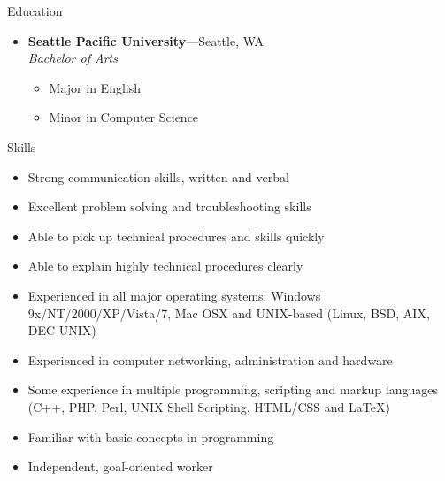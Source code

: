 \documentclass[10pt,oneside]{article}
\newenvironment{ressection}[1]{
	\vspace{4pt}
	{\fontfamily{ppl}\selectfont\Large#1}
	\begin{itemize}
	\vspace{3pt}
}{
	\end{itemize}
}
\newcommand{\resitem}[1]{
	\vspace{-4pt}
	\item \begin{flushleft} #1 \end{flushleft}
}
\newcommand{\ressubitem}[1]{
	\vspace{-1pt}
	\item \begin{flushleft} #1 \end{flushleft}
}
\newcommand{\resbigitem}[3]{
	\vspace{-5pt}
	\item
	\textbf{#1}---#2 \\
	\textit{#3}
}
\newenvironment{ressubsec}[3]{
	\resbigitem{#1}{#2}{#3}
	\vspace{-2pt}
	\begin{itemize}
}{
	\end{itemize}
}
\begin{document}
\begin{ressection}{Education}

	\begin{ressubsec}{Seattle Pacific University}{Seattle, WA}{Bachelor of Arts}
		\ressubitem{Major in English}
		\ressubitem{Minor in Computer Science}
	\end{ressubsec}

\end{ressection}

\begin{ressection}{Skills}

	\resitem{Strong communication skills, written and verbal}
	\resitem{Excellent problem solving and troubleshooting skills}
	\resitem{Able to pick up technical procedures and skills quickly}
	\resitem{Able to explain highly technical procedures clearly}
	\resitem{Experienced in all major operating systems: Windows 9x/NT/2000/XP/Vista/7, Mac OSX and UNIX-based (Linux, BSD, AIX, DEC UNIX)}
	\resitem{Experienced in computer networking, administration and hardware}
	\resitem{Some experience in multiple programming, scripting and markup languages (C++, PHP, Perl, UNIX Shell Scripting, HTML/CSS and \LaTeX)}
	\resitem{Familiar with basic concepts in programming}
	\resitem{Independent, goal-oriented worker}

\end{ressection}
\end{document}
